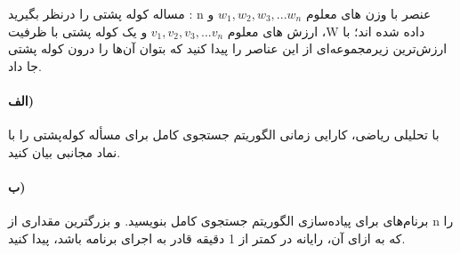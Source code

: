 \documentclass[]{article}
\begin{document}
مساله کوله پشتی را درنظر بگیرید :
n عنصر با وزن های معلوم
$w_1, w_2, w_3,... w_n$
و ارزش های معلوم $v_1, v_2, v_3,... v_n$
و یک کوله پشتی با ظرفیت ،W داده شده اند؛
با ارزش‌ترین زیرمجموعه‌ای از این عناصر را پیدا کنید که بتوان آن‌ها را درون کوله پشتی جا داد.
\paragraph[1.1]{الف)}
با تحلیلی ریاضی، کارایی زمانی الگوریتم جستجوی کامل برای مسأله کوله‌پشتی را با نماد مجانبی  بیان کنید.

\paragraph[1.2]{ب)}
برنام‌های برای پیاده‌سازی الگوریتم جستجوی کامل بنویسید. و بزرگترین مقداری از n را که به ازای آن، رایانه در کمتر از 1 دقیقه قادر به اجرای برنامه باشد، پیدا کنید. 
\end{document}
